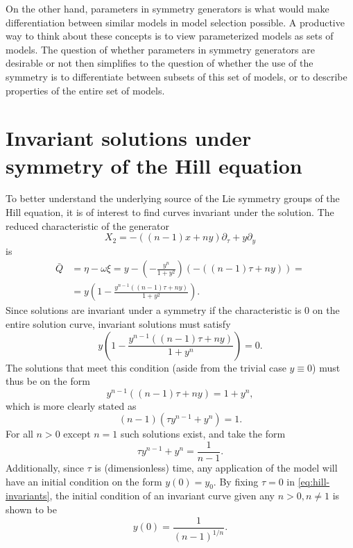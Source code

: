 On the other hand, parameters in symmetry generators is what would make differentiation between similar models in model selection possible.
A productive way to think about these concepts is to view parameterized models as sets of models.
The question of whether parameters in symmetry generators are desirable or not then simplifies to the question of whether the use of the symmetry is to differentiate between subsets of this set of models, or to describe properties of the entire set of models.



\section{Invariant solutions under symmetry of the Hill equation}

To better understand the underlying source of the Lie symmetry groups of the Hill equation, it is of interest to find curves invariant under the solution.
The reduced characteristic of the generator
\begin{equation}
  X_2 = - \left( (n-1) x + n y \right) \partial_\tau + y \partial_y
\end{equation}
is
\begin{align}
  \bar{Q} &= 
  \eta - \omega \xi = 
  y - \left( -\frac{y^n}{1+y^2} \right) \left( - \left( (n-1) \tau + n y \right) \right) =\\
  &= y \left(1 -\frac{y^{n-1} \left( (n-1) \tau + n y \right)}{1+y^2} \right).
\end{align}
Since solutions are invariant under a symmetry if the characteristic is 0 on the entire solution curve, invariant solutions must satisfy
\begin{equation}
  y \left(1 -\frac{y^{n-1} \left( (n-1) \tau + n y \right)}{1+y^n} \right) = 0.
\end{equation}
The solutions that meet this condition (aside from the trivial case \(y \equiv 0\)) must thus be on the form
\begin{equation}
  y^{n-1} \left( (n-1) \tau + n y \right) = 1+y^n,
\end{equation}
which is more clearly stated as
\begin{equation}
  (n-1) \left( \tau y^{n-1} + y^n \right) = 1.
\end{equation}
For all \(n>0\) except \(n=1\) such solutions exist, and take the form
\begin{equation} \label{eq:hill-invariants}
  \tau y^{n-1} + y^n = \frac{1}{n-1}.
\end{equation}
Additionally, since \(\tau\) is (dimensionless) time, any application of the model will have an initial condition on the form \(y(0) = y_0\).
By fixing \(\tau=0\) in \cref{eq:hill-invariants}, the initial condition of an invariant curve given any \(n>0, n\neq1\) is shown to be
\begin{equation}
  y(0) =\frac{1}{(n-1)^{1/n}}.
\end{equation}

